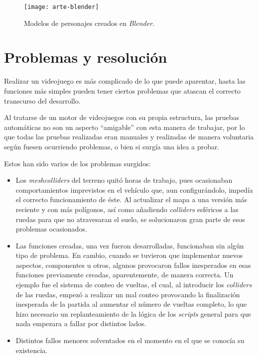 \begin{figure}[h]
	\centering
	\texttt{[image: arte-blender]}
	\caption{Modelos de personajes creados en \textit{Blender}.}
	\label{fig:arte-blender}
\end{figure}

\section{Problemas y resolución}

Realizar un videojuego es más complicado de lo que puede aparentar, hasta las funciones más simples pueden tener ciertos problemas que atascan el correcto transcurso del desarrollo.

Al tratarse de un motor de videojuegos con su propia estructura, las pruebas automáticas no son un aspecto ``amigable'' con esta manera de trabajar, por lo que todas las pruebas realizadas eran manuales y realizadas de manera voluntaria según fuesen ocurriendo problemas, o bien si surgía una idea a probar.

Estos han sido varios de los problemas surgidos:
\begin{itemize}
\tightlist
	\item Los \textit{meshcolliders} del terreno quitó horas de trabajo, pues ocasionaban comportamientos imprevistos en el vehículo que, aun configurándolo, impedía el correcto funcionamiento de éste. Al actualizar el mapa a una versión más reciente y con más polígonos, así como añadiendo \textit{colliders} esféricos a las ruedas para que no atravesaran el suelo, se solucionaron gran parte de esos problemas ocasionados.
	\item Las funciones creadas, una vez fueron desarrolladas, funcionaban sin algún tipo de problema. En cambio, cuando se tuvieron que implementar nuevos aspectos, componentes u otros, algunos provocaron fallos inesperados en esas funciones previamente creadas, aparentemente, de manera correcta. Un ejemplo fue el sistema de conteo de vueltas, el cual, al introducir los \textit{colliders} de las ruedas, empezó a realizar un mal conteo provocando la finalización inesperada de la partida al aumentar el número de vueltas completo, lo que hizo necesario un replanteamiento de la lógica de los \textit{scripts} general para que nada empezara a fallar por distintos lados.
	\item Distintos fallos menores solventados en el momento en el que se conocía su existencia.
\end{itemize}

